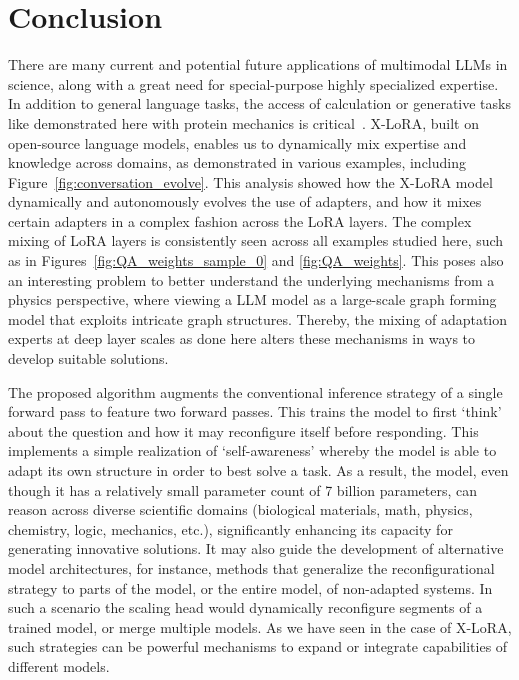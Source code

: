 \documentclass{article}
\begin{document}
\section{Conclusion}

There are many current and potential future applications of multimodal LLMs in science, along with a great need for special-purpose highly specialized expertise. In addition to general language tasks, the access of calculation or generative tasks like demonstrated here with protein mechanics is critical~\cite{Luu2023BioinspiredLLM:Materials,Buehler2023MechGPTModalities,Buehler2023MeLMProblemsb}. X-LoRA, built on open-source language models, enables us to dynamically mix expertise and knowledge across domains, as demonstrated in various examples, including Figure~\ref{fig:conversation_evolve}. This analysis showed how the X-LoRA model dynamically and autonomously evolves the use of adapters, and how it mixes certain adapters in a complex fashion across the LoRA layers. The complex mixing of LoRA layers is consistently seen across all examples studied here, such as in Figures~\ref{fig:QA_weights_sample_0} and \ref{fig:QA_weights}. This poses also an interesting problem to better understand the underlying mechanisms from a physics perspective, where viewing a LLM model as a large-scale graph forming model that exploits intricate graph structures. Thereby, the mixing of adaptation experts at deep layer scales as done here alters these mechanisms in ways to develop suitable solutions. 

The proposed algorithm augments the conventional inference strategy of a single forward pass to feature two forward passes. This trains the model to first `think' about the question and how it may reconfigure itself before responding. This implements a simple realization of `self-awareness’ whereby the model is able to adapt its own structure in order to best solve a task. As a result, the model, even though it has a relatively small parameter count of 7 billion parameters, can reason across diverse scientific domains (biological materials, math, physics, chemistry, logic, mechanics, etc.), significantly enhancing its capacity for generating innovative solutions. It may also guide the development of alternative model architectures, for instance, methods that generalize the reconfigurational strategy to parts of the model, or the entire model, of non-adapted systems. In such a scenario the scaling head would dynamically reconfigure segments of a trained model, or merge multiple models. As we have seen in the case of X-LoRA, such strategies can be powerful mechanisms to expand or integrate capabilities of different models.
\end{document}

